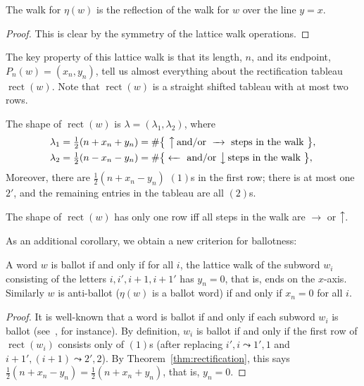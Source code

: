 \documentclass[ALCO,ThmDefs,Unicode,epreuves]{cedram}
\DeclareMathOperator{\rectify}{rect}
\newcommand{\east}[1]{\ensuremath{\xrightarrow{\ #1\ }}}
\newcommand{\west}[1]{\ensuremath{\xleftarrow{\ #1\ }}}
\newcommand{\north}[1]{\ensuremath{\big \uparrow \!\text{\raisebox{.1ex}{\scriptsize $#1$}}}}
\newcommand{\south}[1]{\ensuremath{\big \downarrow \!\text{\raisebox{.1ex}{\scriptsize $#1$}}}}
\begin{document}
\begin{prop}
The walk for $\eta(w)$ is the reflection of the walk for $w$ over the line $y=x$.
\end{prop}

\begin{proof}
This is clear by the symmetry of the lattice walk operations.
\end{proof}

The key property of this lattice walk is that its length, $n$, and its endpoint, $P_n(w) = (x_n, y_n)$, tell us almost everything about the rectification tableau $\rectify(w)$. Note that $\rectify(w)$ is a straight shifted tableau with at most two rows.

\begin{theorem}\label{thm:rectification}
The shape of $\rectify(w)$ is $\lambda = (\lambda_1, \lambda_2)$, where
\begin{align*}
\lambda_1 &= \tfrac{1}{2}(n+x_n+y_n) = \#\big\{\ \north{} \text{ and/or } \east{} \text{ steps in the walk\ }\big\}, \\
\lambda_2 &= \tfrac{1}{2}(n-x_n-y_n) = \#\big\{\west{} \text{ and/or } \south{} \text{ steps in the walk\ }\big\},
\end{align*}
Moreover, there are $\tfrac{1}{2}(n+x_n-y_n)$ $(1)$s in the first row; there is at most one $2'$, and the remaining entries in the tableau are all $(2)$s.
\end{theorem}

\begin{coro}
The shape of $\rectify(w)$ has only one row iff all
steps in the walk are $\east{~}$ or $\north{}$.
\end{coro}

As an additional corollary, we obtain a new criterion for ballotness:

\begin{coro} \label{cor:ballot-walk-criterion}
A word $w$ is ballot if and only if for all $i$, the lattice walk of the subword $w_i$ consisting of the letters $i,i',i+1,i+1'$ has $y_n = 0$, that is, ends on the $x$-axis. Similarly $w$ is anti-ballot \textup{(}\ie $\eta(w)$ is a ballot word\textup{)} if and only if $x_n = 0$ for all $i$.
\end{coro}

\begin{proof}
It is well-known that a word is ballot if and only if each subword $w_i$ is ballot (see~\cite{Stembridge}, for instance). By definition, $w_i$ is ballot if and only if the first row of $\rectify(w_i)$ consists only of $(1)$s (after replacing $i',i \leadsto 1',1$ and $i+1',(i+1) \leadsto 2',2$). By Theorem~\ref{thm:rectification}, this says $\tfrac{1}{2}(n+x_n-y_n) = \tfrac{1}{2}(n+x_n+y_n)$, that is, $y_n=0$.
\end{proof}
\end{document}
